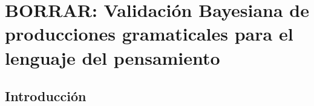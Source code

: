 

\chapter{BORRAR: Validación Bayesiana de producciones gramaticales para el lenguaje del pensamiento}\label{chapter:PO}

\section{Introducción}


